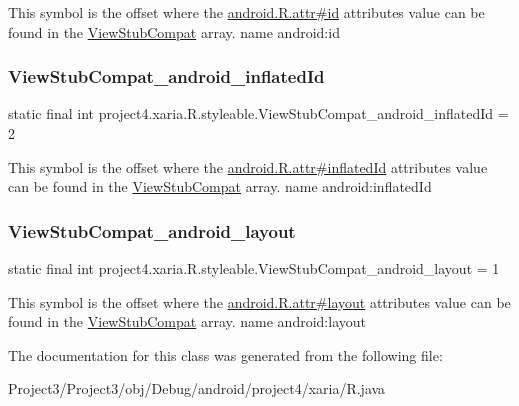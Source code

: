This symbol is the offset where the \hyperlink{}{android.\+R.\+attr\#id} attribute\textquotesingle{}s value can be found in the \hyperlink{classproject4_1_1xaria_1_1R_1_1styleable_a4fd904903e273c876de7c4d8bcb8bd8e}{View\+Stub\+Compat} array.  name android\+:id \mbox{\label{classproject4_1_1xaria_1_1R_1_1styleable_aed35f6f33d2063fd66044a9bdf7ce518}} 
\subsubsection{\texorpdfstring{View\+Stub\+Compat\+\_\+android\+\_\+inflated\+Id}{ViewStubCompat\_android\_inflatedId}}
{\footnotesize\ttfamily static final int project4.\+xaria.\+R.\+styleable.\+View\+Stub\+Compat\+\_\+android\+\_\+inflated\+Id = 2\hspace{0.3cm}{\ttfamily [static]}}

This symbol is the offset where the \hyperlink{}{android.\+R.\+attr\#inflated\+Id} attribute\textquotesingle{}s value can be found in the \hyperlink{classproject4_1_1xaria_1_1R_1_1styleable_a4fd904903e273c876de7c4d8bcb8bd8e}{View\+Stub\+Compat} array.  name android\+:inflated\+Id \mbox{\label{classproject4_1_1xaria_1_1R_1_1styleable_a8256a8832d4f3ad9530b0fabe1403b69}} 
\subsubsection{\texorpdfstring{View\+Stub\+Compat\+\_\+android\+\_\+layout}{ViewStubCompat\_android\_layout}}
{\footnotesize\ttfamily static final int project4.\+xaria.\+R.\+styleable.\+View\+Stub\+Compat\+\_\+android\+\_\+layout = 1\hspace{0.3cm}{\ttfamily [static]}}

This symbol is the offset where the \hyperlink{}{android.\+R.\+attr\#layout} attribute\textquotesingle{}s value can be found in the \hyperlink{classproject4_1_1xaria_1_1R_1_1styleable_a4fd904903e273c876de7c4d8bcb8bd8e}{View\+Stub\+Compat} array.  name android\+:layout 

The documentation for this class was generated from the following file\+:\begin{DoxyCompactItemize}
\item 
Project3/\+Project3/obj/\+Debug/android/project4/xaria/R.\+java\end{DoxyCompactItemize}
